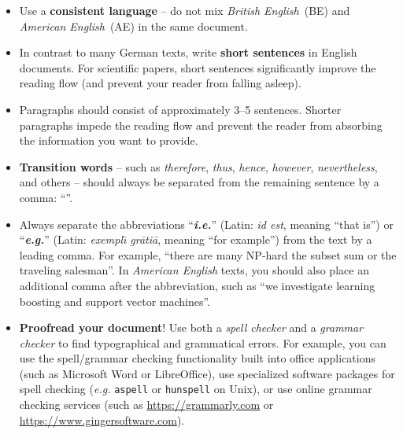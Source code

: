 \documentclass[11pt,a4paper]{article}
\begin{document}
\begin{itemize}

\item Use a \textbf{consistent language} -- do not mix \emph{British English}~(BE) and \emph{American English}~(AE) in the same document. 
 
\item In contrast to many German texts, write \textbf{short sentences} in 
English documents. For scientific papers, short sentences significantly improve 
the reading flow (and prevent your reader from falling asleep).
 
\item Paragraphs should consist of approximately 3--5 sentences. Shorter paragraphs impede the reading flow and prevent the reader from absorbing the information you want to provide.
 
\item \textbf{Transition words} -- such as \emph{therefore}, \emph{thus}, \emph{hence}, \emph{however}, \emph{nevertheless}, and others -- should always be separated from the remaining sentence by a comma: ``''.
 
\item Always separate the abbreviations ``\textbf{\emph{i.e.}}'' (Latin: \emph{id est}, meaning ``that is'') or ``\textbf{\emph{e.g.}}'' (Latin: \emph{exempl\={\i} gr\={a}ti\={a}}, meaning ``for example'') from the text by a leading comma. For example, ``there are many NP-hard  the subset sum or the traveling salesman''. In \emph{American English} texts, you should also place an additional comma after the abbreviation, such as ``we investigate learning  boosting and support vector machines''.
 


 \item \textbf{Proofread your document}! Use both a \emph{spell checker} and a \emph{grammar checker} to find typographical and grammatical errors.
 For example, you can use the spell/grammar checking functionality built into office applications (such as Microsoft Word or LibreOffice), use specialized software packages for spell checking (\emph{e.g.} \texttt{aspell} or \texttt{hunspell} on Unix), or use online grammar checking services (such as \url{https://grammarly.com} or \url{https://www.gingersoftware.com}).
% 
\end{itemize}
\end{document}
